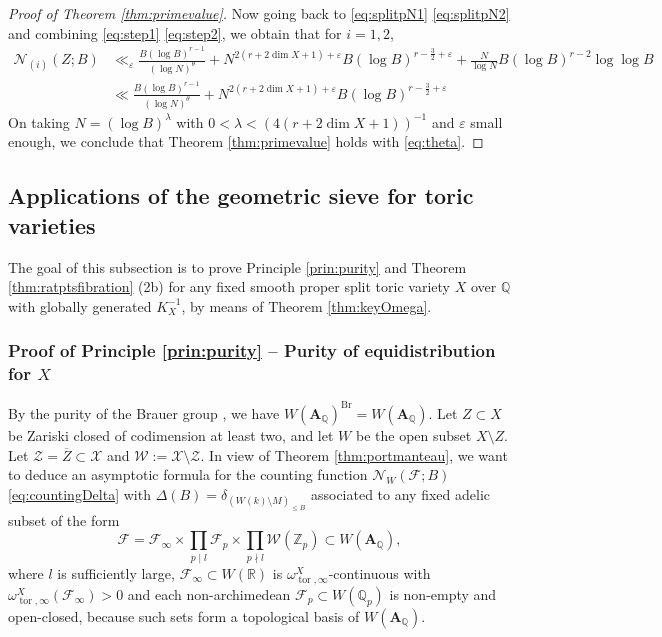 \documentclass[11pt,letterpaper]{amsart}
\newcommand{\BQ}{{\mathbb {Q}}}
\newcommand{\BR}{{\mathbb {R}}}
\newcommand{\BZ}{{\mathbb {Z}}}
\newcommand{\CF}{{\mathcal {F}}}
\newcommand{\CN}{{\mathcal {N}}}
\newcommand{\CW}{{\mathcal {W}}}
\newcommand{\CX}{{\mathcal {X}}}
\newcommand{\CZ}{{\mathcal {Z}}}
\newcommand{\RA}{{\mathbf {A}}}
\theoremstyle{plain}
\numberwithin{equation}{section}
\theoremstyle{definition}
\theoremstyle{remark}
\begin{document}
\begin{proof}[Proof of Theorem \ref{thm:primevalue}]
Now going back to \eqref{eq:splitpN1} \eqref{eq:splitpN2} and combining \eqref{eq:step1} \eqref{eq:step2},  we obtain that for $i=1,2$,
\begin{align*}
	\CN_{(i)}(Z;B) &\ll_\varepsilon  \frac{B(\log B)^{r-1}}{(\log N)^{\theta}}+N^{2(r+2\dim X+1)+\varepsilon}B(\log B)^{r-\frac{3}{2}+\varepsilon}+\frac{N}{\log N}B(\log B)^{r-2}\log\log B\\ &\ll \frac{B(\log B)^{r-1}}{(\log N)^{\theta}}+N^{2(r+2\dim X+1)+\varepsilon}B(\log B)^{r-\frac{3}{2}+\varepsilon}
\end{align*}
On taking $N=(\log B)^\lambda$ with $0<\lambda<(4(r+2\dim X+1))^{-1}$ and $\varepsilon$ small enough, we conclude that Theorem \ref{thm:primevalue} holds with \eqref{eq:theta}. \end{proof}

\subsection{Applications of the geometric sieve for toric varieties}\label{se:appgeomsieve}
The goal of this subsection is to prove Principle \ref{prin:purity} and Theorem \ref{thm:ratptsfibration} (2b) for any fixed smooth proper split toric variety $X$ over $\BQ$ with globally generated $K_X^{-1}$, by means of Theorem \ref{thm:keyOmega}.

\subsubsection{Proof of Principle \ref{prin:purity} -- Purity of equidistribution for $X$}
	By the purity of the Brauer group \cite[\S6]{Grothendieck}, we have $W(\RA_\BQ)^{\operatorname{Br}}=W(\RA_\BQ)$. Let $Z\subset X$ be Zariski closed of codimension at least two, and let $W$ be the open subset $X\setminus Z$. Let $\CZ=\overline{Z}\subset \CX$ and $\CW:=\CX\setminus \CZ$.
 In view of Theorem \ref{thm:portmanteau}, we want to deduce an asymptotic formula for the counting function $\CN_W(\CF;B)$ \eqref{eq:countingDelta} with $\Delta(B)=\delta_{(W(k)\setminus M)_{\leqslant B}}$ associated to any fixed adelic subset of the form $$\CF=\CF_\infty\times\prod_{p\mid l}\CF_p\times \prod_{p\nmid l} \CW(\BZ_p)\subset W(\RA_\BQ),$$ where $l$ is sufficiently large, $\CF_\infty\subset W(\BR)$ is $\omega_{\operatorname{tor},\infty}^X$-continuous with $\omega_{\operatorname{tor},\infty}^X(\CF_\infty)>0$ and each non-archimedean $\CF_p \subset W(\BQ_p)$ is non-empty and open-closed, because such sets form a topological basis of $W(\RA_\BQ)$.
\end{document}
